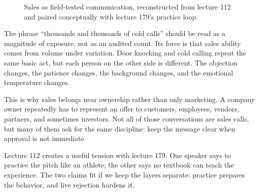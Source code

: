 \documentclass[11pt,oneside]{book}
\begin{document}
\begin{figure}
\centering
{}
\caption{Sales as field-tested communication, reconstructed from lecture 112 and paired conceptually with lecture 179's practice loop.}
\end{figure}

The phrase ``thousands and thousands of cold calls'' should be read as a magnitude of exposure, not as an audited count. Its force is that sales ability comes from volume under variation. Door knocking and cold calling repeat the same basic act, but each person on the other side is different. The objection changes, the patience changes, the background changes, and the emotional temperature changes.

This is why sales belongs near ownership rather than only marketing. A company owner repeatedly has to represent an offer to customers, employees, vendors, partners, and sometimes investors. Not all of those conversations are sales calls, but many of them ask for the same discipline: keep the message clear when approval is not immediate.

\begin{remark}
Lecture 112 creates a useful tension with lecture 179. One speaker says to practice the pitch like an athlete; the other says no textbook can teach the experience. The two claims fit if we keep the layers separate: practice prepares the behavior, and live rejection hardens it.
\end{remark}
\end{document}
